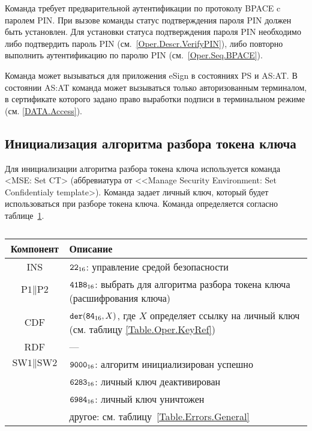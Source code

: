 Команда требует предварительной аутентификации по 
протоколу BPACE c паролем PIN. 
При вызове команды статус подтверждения 
пароля PIN должен быть установлен.
Для установки статуса подтверждения пароля PIN 
необходимо либо подтвердить пароль PIN (см.~\ref{Oper.Descr.VerifyPIN}), 
либо повторно выполнить аутентификацию по паролю PIN (см.~\ref{Oper.Seq.BPACE}).

Команда может вызываться для приложения eSign в 
состояниях PS и AS:AT. В состоянии AS:AT команда 
может вызываться только авторизованным терминалом,
в сертификате которого задано право 
выработки подписи в терминальном режиме (см. \ref{DATA.Access}).


\subsection{Инициализация алгоритма разбора токена ключа}
\label{Oper.Descr.SetCT}

Для инициализации алгоритма разбора токена ключа
используется команда <MSE: Set CT> 
(аббревиатура от <<Manage Security Environment: Set Confidentialy template>).
Команда задает личный ключ, который будет использоваться при разборе токена ключа.
Команда определяется согласно таблице~\ref{Table.Oper.SetCTCmd}.

\begin{table}[hbt]
\caption{}\label{Table.Oper.SetCTCmd}
\begin{tabular}{|c|p{14cm}|}
\hline
Компонент & Описание \\
\hline
\hline
INS & $\texttt{22}_{16}$: управление средой безопасности\\ 
\hline
$\text{P1} \parallel\text{P2}$ & $\texttt{41B8}_{16}$: 
выбрать для алгоритма разбора токена ключа
(расшифрования ключа) \\
\hline
CDF & 
$\texttt{der}(\texttt{84}_{16}, X)$, 
где $X$ определяет ссылку на личный ключ
(см. таблицу \ref{Table.Oper.KeyRef})\\
\hline
RDF &  --- \\
\hline
$\text{SW1} \parallel \text{SW2}$ & 
$\texttt{9000}_{16}$: алгоритм инициализирован успешно \\
  & $\texttt{6283}_{16}$: личный ключ деактивирован \\
  & $\texttt{6984}_{16}$: личный ключ уничтожен \\
  & другое: см. таблицу~\ref{Table.Errors.General} \\
\hline
\end{tabular}
\end{table}

